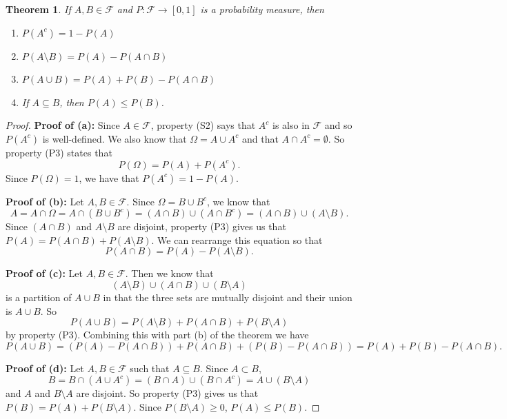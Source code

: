 \documentclass[
]{book}
\providecommand{\tightlist}{%
  \setlength{\itemsep}{0pt}\setlength{\parskip}{0pt}}
\newtheorem{theorem}{Theorem}[chapter]
\theoremstyle{definition}
\theoremstyle{definition}
\theoremstyle{definition}
\theoremstyle{definition}
\theoremstyle{remark}
\begin{document}
\begin{theorem}

If \(A, B\in \mathcal{F}\) and \(P:\mathcal{F}\rightarrow [0,1]\) is a probability measure, then

\begin{enumerate}
\def\labelenumi{\alph{enumi}.}
\tightlist
\item
  \(P(A^c) = 1- P(A)\)
\item
  \(P(A \setminus B) = P(A) - P(A\cap B)\)
\item
  \(P(A \cup B) = P(A)+P(B) - P(A\cap B)\)
\item
  If \(A\subseteq B\), then \(P(A)\leq P(B)\).
\end{enumerate}

\end{theorem}

\begin{proof}
\textbf{Proof of (a):} Since \(A\in \mathcal{F}\), property (S2) says that \(A^c\) is also in \(\mathcal{F}\) and so \(P(A^c)\) is well-defined. We also know that \(\Omega = A \cup A^c\) and that \(A\cap A^c = \emptyset\). So property (P3) states that
\[ P(\Omega) = P(A) + P(A^c).\] Since \(P(\Omega)=1\), we have that \(P(A^c)=1-P(A)\).

\textbf{Proof of (b):} Let \(A,B\in \mathcal{F}\). Since \(\Omega = B \cup B^c\), we know that \[A = A \cap \Omega = A \cap (B \cup B^c) = (A\cap B) \cup (A \cap B^c) = (A\cap B) \cup (A \setminus B).\] Since \((A\cap B)\) and \(A\setminus B\) are disjoint, property (P3) gives us that \(P(A) = P(A\cap B) + P(A \setminus B)\). We can rearrange this equation so that \[P(A\cap B) = P(A) - P(A\setminus B).\]

\textbf{Proof of (c):} Let \(A,B\in \mathcal{F}\). Then we know that
\[(A\setminus B) \cup (A\cap B) \cup (B\setminus A)\] is a partition of \(A\cup B\) in that the three sets are mutually disjoint and their union is \(A\cup B\). So
\[P(A\cup B) = P(A\setminus B) + P(A\cap B) + P(B\setminus A)\] by property (P3). Combining this with part (b) of the theorem we have
\[P(A\cup B) = (P(A)-P(A\cap B)) + P(A\cap B) + (P(B)-P(A\cap B)) = P(A) + P(B) - P(A\cap B).\]

\textbf{Proof of (d):} Let \(A,B\in \mathcal{F}\) such that \(A\subseteq B\). Since \(A\subset B\),
\[B= B \cap (A \cup A^c) = (B\cap A) \cup (B\cap A^c) = A \cup (B\setminus A)\] and \(A\) and \(B\setminus A\) are disjoint. So property (P3) gives us that \(P(B) = P(A) + P(B\setminus A)\). Since \(P(B\setminus A) \geq 0\), \(P(A) \leq P(B)\).
\end{proof}
\end{document}
